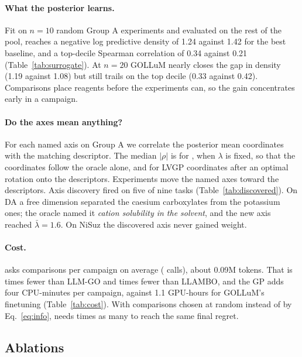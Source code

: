 \paragraph{What the posterior learns.}
Fit on $n=10$ random Group A experiments and evaluated on the rest of the pool, \ours{} reaches a negative log predictive density of 1.24 against 1.42 for the best baseline, and a top-decile Spearman correlation of 0.34 against 0.21 (Table~\ref{tab:surrogate}). At $n=20$ GOLLuM nearly closes the gap in density (1.19 against 1.08) but still trails on the top decile (0.33 against 0.42). Comparisons place reagents before the experiments can, so the gain concentrates early in a campaign.

\paragraph{Do the axes mean anything?}
For each named axis on Group A we correlate the posterior mean coordinates with the matching descriptor. The median $|\rho|$ is \AxisRho{} for \ours{}, \AxisRhoFixed{} when $\lambda$ is fixed, so that the coordinates follow the oracle alone, and \AxisRhoLVGP{} for LVGP coordinates after an optimal rotation onto the descriptors. Experiments move the named axes toward the descriptors. Axis discovery fired on five of nine tasks (Table~\ref{tab:discovered}). On DA a free dimension separated the caesium carboxylates from the potassium ones; the oracle named it \emph{cation solubility in the solvent}, and the new axis reached $\bar\lambda=1.6$. On NiSuz the discovered axis never gained weight.

\paragraph{Cost.}
\ours{} asks \NQueries{} comparisons per campaign on average (\NCalls{} calls), about 0.09M tokens. That is \TokLLMGO{} times fewer than LLM-GO and \TokLLAMBO{} times fewer than LLAMBO, and the GP adds four CPU-minutes per campaign, against 1.1 GPU-hours for GOLLuM's finetuning (Table~\ref{tab:cost}). With comparisons chosen at random instead of by Eq.~\eqref{eq:info}, \ours{} needs \RandFactor{} times as many to reach the same final regret.

\subsection{Ablations}
\label{sec:ablation}



